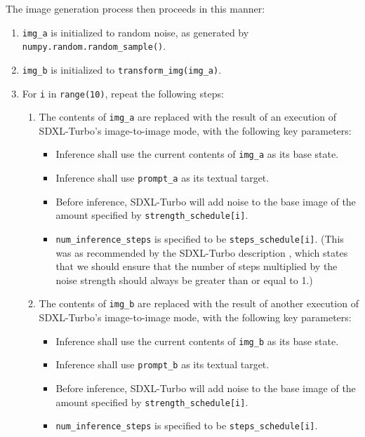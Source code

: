 \documentclass[12pt,letterpaper]{article}
\begin{document}
    \noindent{}The image generation process then proceeds in this manner:
    \begin{enumerate}
        \setlength{\itemsep}{0pt}
        \item \texttt{img\_a} is initialized to random noise, as generated by \\\texttt{numpy.random.random\_sample()}.
        \item \texttt{img\_b} is initialized to \texttt{transform\_img(img\_a)}.
        \item For \texttt{i} in \texttt{range(10)}, repeat the following steps:
        \begin{enumerate}
            \item The contents of \texttt{img\_a} are replaced with the result of an execution of SDXL-Turbo's image-to-image mode, with the following key parameters:
            \begin{itemize}
                \item Inference shall use the current contents of \texttt{img\_a} as its base state.
                \item Inference shall use \texttt{prompt\_a} as its textual target.
                \item Before inference, SDXL-Turbo will add noise to the base image of the amount specified by \texttt{strength\_schedule[i]}.
                \item \texttt{num\_inference\_steps} is specified to be \texttt{steps\_schedule[i]}. (This was as recommended by the SDXL-Turbo description \cite{sdxl_turbo}, which states that we should ensure that the number of steps multiplied by the noise strength should always be greater than or equal to 1.)
            \end{itemize}
            \item The contents of \texttt{img\_b} are replaced with the result of another execution of SDXL-Turbo's image-to-image mode, with the following key parameters:
            \begin{itemize}
                \item Inference shall use the current contents of \texttt{img\_b} as its base state.
                \item Inference shall use \texttt{prompt\_b} as its textual target.
                \item Before inference, SDXL-Turbo will add noise to the base image of the amount specified by \texttt{strength\_schedule[i]}.
                \item \texttt{num\_inference\_steps} is specified to be \texttt{steps\_schedule[i]}.

\end{itemize}
\end{enumerate}
\end{enumerate}
\end{document}
